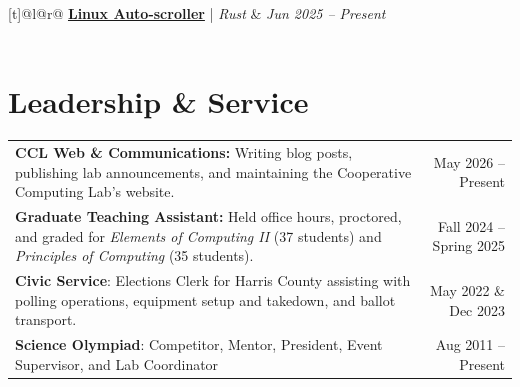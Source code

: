 \documentclass[letterpaper,11pt]{article}
\begin{document}
\begin{tabular*}{\textwidth}[t]{@{}l@{\extracolsep{\fill}}r@{}}
  \textbf{\href{https://github.com/RHartung-ND/Auto-Scroll-Linux}{Linux Auto-scroller}} | \textit{Rust} & \textit{Jun 2025 -- Present}\\
  \vspace{-10pt}\\
\end{tabular*}

\section{Leadership \& Service}
\begin{small}
  \begin{tabularx}{\textwidth}{>{\raggedright\arraybackslash}X @{\hspace{1em}} r @{}}
    \textbf{CCL Web \& Communications:} Writing blog posts, publishing lab announcements, and maintaining the Cooperative Computing Lab's website. & May 2026 -- Present \\
    \textbf{Graduate Teaching Assistant:} Held office hours, proctored, and graded for \textit{Elements of Computing II} (37 students) and \textit{Principles of Computing} (35 students). & Fall 2024 -- Spring 2025 \\
    \textbf{Civic Service}: Elections Clerk for Harris County assisting with polling operations, equipment setup and takedown, and ballot transport. & May 2022 \& Dec 2023 \\
    \textbf{Science Olympiad}: Competitor, Mentor, President, Event Supervisor, and Lab Coordinator & Aug 2011 -- Present \\
  \end{tabularx}
\end{small}
\end{document}
